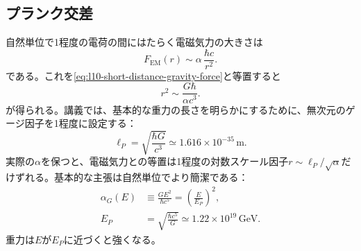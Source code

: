 \begin{classroomqa}
\end{classroomqa}

\begin{classroomqa}
\end{classroomqa}

\begin{classroomqa}
\end{classroomqa}

\subsection{プランク交差}

自然単位で1程度の電荷の間にはたらく電磁気力の大きさは
\begin{equation}
  F_{\mathrm{EM}}(r)
  \sim
  \alpha\,\frac{\hbar c}{r^2}.
  \label{eq:l10-em-force-alpha}
\end{equation}
である。これを\eqref{eq:l10-short-distance-gravity-force}と等置すると
\begin{equation}
  r^2\sim\frac{G\hbar}{\alpha c^3}.
  \label{eq:l10-gravity-em-crossing}
\end{equation}
が得られる。講義では、基本的な重力の長さを明らかにするために、無次元のゲージ因子を1程度に設定する：
\begin{equation}
  \boxed{\ell_P=\sqrt{\frac{\hbar G}{c^3}}}
  \simeq1.616\times10^{-35}\,\mathrm{m}.
  \label{eq:l10-planck-length}
\end{equation}
実際の\(\alpha\)を保つと、電磁気力との等置は1程度の対数スケール因子\(r\sim\ell_P/\sqrt\alpha\)だけずれる。基本的な主張は自然単位でより簡潔である：
\begin{equation}
\begin{aligned}
  \alpha_G(E)
  &\equiv\frac{GE^2}{\hbar c^5}
  =\left(\frac{E}{E_P}\right)^2,
  \\
  E_P
  &=\sqrt{\frac{\hbar c^5}{G}}
  \simeq1.22\times10^{19}\,\mathrm{GeV}.
\end{aligned}
  \label{eq:l10-gravitational-coupling}
\end{equation}
重力は\(E\)が\(E_P\)に近づくと強くなる。

